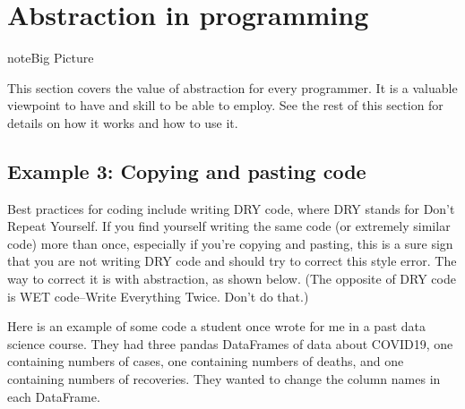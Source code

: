 \documentclass[letterpaper,10pt,english]{sphinxmanual}
\begin{document}
\section{Abstraction in programming}
\label{\detokenize{chapter-7-abstraction:abstraction-in-programming}}
\begin{sphinxadmonition}{note}{Big Picture}

This section covers the value of abstraction for every programmer.  It is a valuable viewpoint to have and skill to be able to employ.  See the rest of this section for details on how it works and how to use it.
\end{sphinxadmonition}


\subsection{Example 3: Copying and pasting code}
\label{\detokenize{chapter-7-abstraction:example-3-copying-and-pasting-code}}
Best practices for coding include writing DRY code, where DRY stands for Don’t Repeat Yourself.  If you find yourself writing the same code (or extremely similar code) more than once, especially if you’re copying and pasting, this is a sure sign that you are not writing DRY code and should try to correct this style error.  The way to correct it is with abstraction, as shown below.  (The opposite of DRY code is WET code–Write Everything Twice.  Don’t do that.)

Here is an example of some code a student once wrote for me in a past data science course.  They had three pandas DataFrames of data about COVID\sphinxhyphen{}19, one containing numbers of cases, one containing numbers of deaths, and one containing numbers of recoveries.  They wanted to change the column names in each DataFrame.
\end{document}
